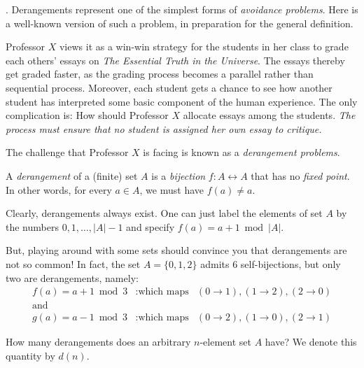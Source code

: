 \bigskip

 

.
Derangements represent one of the simplest forms of {\em avoidance problems}.  Here is a
well-known version of such a problem, in preparation for the general definition.

\smallskip

Professor $X$ views it as a win-win strategy for the students in her class to grade each others' essays on {\it The Essential Truth in the Universe}.  The essays thereby get graded faster, as the grading process becomes a parallel rather than sequential process.  Moreover, each student gets a chance to see how another student has interpreted some basic component of the human experience.  The only complication is: How should Professor $X$  allocate essays among the students.  {\em The process must ensure that no student is assigned her own essay to critique.}

\smallskip

The challenge that Professor $X$ is facing is known as a {\em derangement problems}.

\bigskip

\noindent 
A {\em derangement} of a (finite) set $A$ is a {\em bijection} $f: A \leftrightarrow A$ that has no 
{\em fixed point}.  In other words, for every $a \in A$, we must have $f(a) \neq a$.

\medskip

Clearly, derangements always exist.  One can just label the elements of set $A$ by the numbers
$0, 1, \ldots, |A|-1$ and specify $f(a) = a+1 \bmod |A|$.

\medskip

But, playing around with some sets should convince you that derangements are not so common!
In fact, the set  $A = \{0, 1,2 \}$ admits $6$ self-bijections, but only two are derangements, namely:
\[
\begin{array}{lll}
f(a) = a+1 \bmod 3 &: \mbox{which maps} &(0 \rightarrow 1),  (1 \rightarrow 2), (2 \rightarrow 0) \\
\mbox{and} &  & \\
g(a) = a-1 \bmod 3 &: \mbox{which maps} & (0 \rightarrow 2),  (1 \rightarrow 0), (2 \rightarrow 1)
\end{array}
\]

\medskip

How many derangements does an arbitrary $n$-element set $A$ have?   We denote this quantity by $d(n)$.

